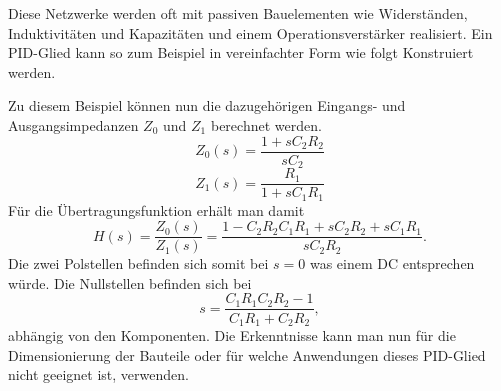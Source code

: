Diese Netzwerke werden oft mit passiven Bauelementen wie Widerständen, Induktivitäten und Kapazitäten und einem Operationsverstärker realisiert.
Ein PID-Glied kann so zum Beispiel in vereinfachter Form wie folgt Konstruiert werden.
\begin{center}
	\tikzset{>=latex}
\end{center}
Zu diesem Beispiel können nun die dazugehörigen Eingangs- und Ausgangsimpedanzen $Z_0$ und $Z_1$ berechnet werden.
\begin{equation*}
Z_{0}(s)
=
\frac{1+s C_{2} R_{2}}{s C_{2}}
\end{equation*}
\begin{equation*}
Z_{1}(s)
=
\frac{R_{1}}{1+s C_{1} R_{1}}
\end{equation*}
Für die Übertragungsfunktion erhält man damit
\begin{equation*}
H(s)
=
\frac{Z_{0}(s)}{Z_{1}(s)}
=
\frac{1-C_2 R_2 C_1 R_1+ s C_2 R_2 +s C_1 R_1 }{s C_2 R_2}.
\end{equation*}
Die zwei Polstellen befinden sich somit bei $s=0$ was einem DC entsprechen würde.
Die Nullstellen befinden sich bei
\begin{equation*}
s
=
\frac{C_1 R_1 C_2 R_2 -1}{C_1 R_1 + C_2 R_2},
\end{equation*}
abhängig von den Komponenten.
Die Erkenntnisse kann man nun für die Dimensionierung der Bauteile oder für welche Anwendungen dieses PID-Glied nicht geeignet ist, verwenden.

